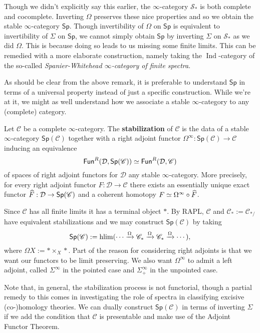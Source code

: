 \documentclass[11pt]{article}
\renewcommand{\C}{\mathscr{C}}
\newcommand{\D}{\mathcal{D}}
\renewcommand{\S}{\mathcal{S}}
\DeclareMathOperator{\hlim}{hlim} %
\DeclareMathOperator{\Ind}{Ind}
\renewcommand{\Sp}{\mathsf{Sp}} %
\begin{document}
\begin{remark}
Though we didn't explicitly say this earlier, the $\infty$-category $\S_*$ is both complete and cocomplete. Inverting $\Omega$ preserves these nice properties and so we obtain the stable $\infty$-category $\Sp$. Though invertibility of $\Omega$ on $\Sp$ is equivalent to invertibility of $\Sigma$ on $\Sp$, we cannot simply obtain $\Sp$ by inverting $\Sigma$ on $\S_*$ as we did $\Omega$. This is because doing so leads to us missing some finite limits. This can be remedied with a more elaborate construction, namely taking the $\Ind$-category of the so-called \emph{Spanier-Whitehead $\infty$-category of finite spectra}.
\end{remark}

As should be clear from the above remark, it is preferable to understand $\Sp$ in terms of a universal property instead of just a specific construction. While we're at it, we might as well understand how we associate a stable $\infty$-category to any (complete) category.

\begin{definition}
Let $\C$ be a complete $\infty$-category. The \textbf{stabilization} of $\C$ is the data of a stable $\infty$-category $\Sp(\C)$ together with a right adjoint functor $\Omega^{\infty}: \Sp(\C)\to\C$ inducing an equivalence 
$$\Fun^R(\D,\Sp(\C))\simeq\Fun^R(\D,\C)$$
of spaces of right adjoint functors for $\D$ any stable $\infty$-category. More precisely, for every right adjoint functor $F: \D\to\C$ there exists an essentially unique exact functor $\w{F}: \D\to\Sp(\C)$ and a coherent homotopy $F\simeq\Omega^{\infty}\circ\widehat{F}$.
\end{definition}

Since $\C$ has all finite limits it has a terminal object $*$. By RAPL, $\C$ and $\C_*:=\C_{*/}$ have equivalent stabilizations and we may construct $\Sp(\C)$ by taking 
$$\Sp(\C):=\hlim(\cdots\xto{\Omega}\C_*\xto{\Omega}\C_*\xto{\Omega}\cdots),$$
where $\Omega X:=*\times_X*$. Part of the reason for considering right adjoints is that we want our functors to be limit preserving. We also want $\Omega^{\infty}$ to admit a left adjoint, called $\Sigma^{\infty}$ in the pointed case and $\Sigma_+^{\infty}$ in the unpointed case. 

\begin{remark}
Note that, in general, the stabilization process is not functorial, though a partial remedy to this comes in investigating the role of spectra in classifying excisive (co-)homology theories. We can dually construct $\Sp(\C)$ in terms of inverting $\Sigma$ if we add the condition that $\C$ is presentable and make use of the Adjoint Functor Theorem.
\end{remark}
\end{document}
